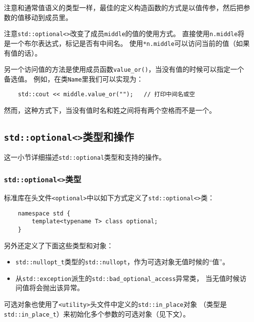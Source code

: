 注意和通常值语义的类型一样，最佳的定义构造函数的方式是以值传参，然后把参数的值移动到成员里。

注意\texttt{std::optional<>}改变了成员\texttt{middle}的值的使用方式。
直接使用\texttt{n.middle}将是一个布尔表达式，标记是否有中间名。
使用\texttt{*n.middle}可以访问当前的值（如果有值的话）。

另一个访问值的方法是使用成员函数\texttt{value\_or()}，当没有值的时候可以指定一个备选值。
例如，在类\texttt{Name}里我们可以实现为：
\begin{lstlisting}
    std::cout << middle.value_or("");   // 打印中间名或空
\end{lstlisting}
然而，这种方式下，当没有值时名和姓之间将有两个空格而不是一个。

\subsection{\texttt{std::optional<>}类型和操作}
这一小节详细描述\texttt{std::optional}类型和支持的操作。

\subsubsection{\texttt{std::optional<>}类型}
标准库在头文件\texttt{<optional>}中以如下方式定义了\texttt{std::optional<>}类：
\begin{lstlisting}
    namespace std {
        template<typename T> class optional;
    }
\end{lstlisting}
另外还定义了下面这些类型和对象：\label{nullopt}
\begin{itemize}[leftmargin=*]
    \item \texttt{std::nullopt\_t}类型的\texttt{std::nullopt}，作为可选对象无值时候的“值”。
    \item 从\texttt{std::exception}派生的\texttt{std::bad\_optional\_access}异常类，
    当无值时候访问值将会抛出该异常。
\end{itemize}
可选对象也使用了\texttt{<utility>}头文件中定义的\texttt{std::in\_place}对象
（类型是\texttt{std::in\_place\_t}）来初始化多个参数的可选对象（见下文）。

